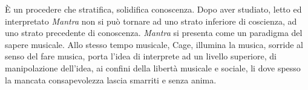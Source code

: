 \begin{refsection}
È un procedere che stratifica, solidifica conoscenza. Dopo aver studiato, letto
ed interpretato \emph{Mantra} non si può tornare ad uno strato inferiore di
coscienza, ad uno strato precedente di conoscenza. \emph{Mantra} si presenta
come un paradigma del sapere musicale. Allo stesso tempo musicale, Cage, illumina
la musica, sorride al senso del fare musica, porta l'idea di interprete ad un
livello superiore, di manipolazione dell'idea, ai confini della libertà musicale
e sociale, li dove spesso la mancata consapevolezza lascia smarriti e senza anima.


%









\printbibliography
\end{refsection}
